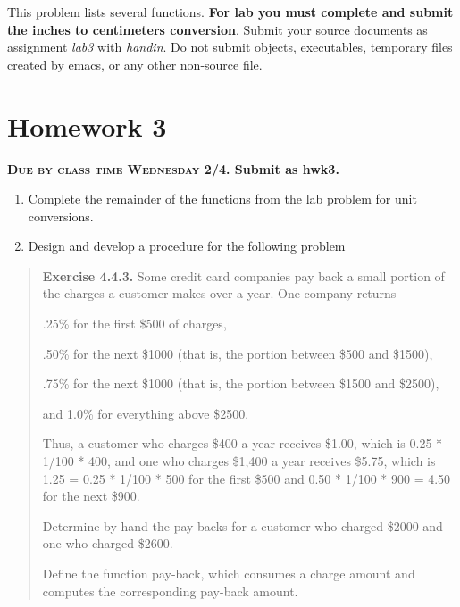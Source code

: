 \documentclass[]{tufte-handout}
\begin{document}
This problem lists several functions. \textbf{For lab you must complete and submit the inches to centimeters conversion}. Submit your source documents as assignment \textit{lab3} with \textit{handin}.  Do not submit objects, executables, temporary files created by emacs, or any other non-source file. 

\section{Homework 3}

\begin{center}
\textbf{\textsc{Due by class time Wednesday 2/4}. Submit as hwk3.}
\end{center}

\begin{enumerate}
\item Complete the remainder of the functions from the lab problem for unit conversions.
\item Design and develop a procedure for the following problem
\end{enumerate}

\begin{framed}
\begin{quote}
\textbf{Exercise 4.4.3.}   Some credit card companies pay back a small portion of the charges a customer makes over a year. One company returns

.25\% for the first \$500 of charges,

.50\% for the next \$1000 (that is, the portion between \$500 and \$1500),

.75\% for the next \$1000 (that is, the portion between \$1500 and \$2500),

and 1.0\% for everything above \$2500.

Thus, a customer who charges \$400 a year receives \$1.00, which is 0.25 * 1/100 * 400, and one who charges \$1,400 a year receives \$5.75, which is 1.25 = 0.25 * 1/100 * 500 for the first \$500 and 0.50 * 1/100 * 900 = 4.50 for the next \$900.

Determine by hand the pay-backs for a customer who charged \$2000 and one who charged \$2600.

Define the function pay-back, which consumes a charge amount and computes the corresponding pay-back amount.
\end{quote}
\end{framed}
\end{document}
